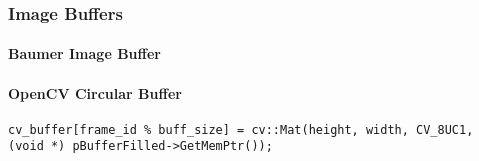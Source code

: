 \subsubsection{Image Buffers}
\label{subsubsec:buffers}

\paragraph{Baumer Image Buffer}


\paragraph{OpenCV Circular Buffer}



\begin{lstlisting}[style=C++]
  cv_buffer[frame_id % buff_size] = cv::Mat(height, width, CV_8UC1, (void *) pBufferFilled->GetMemPtr());
\end{lstlisting}
